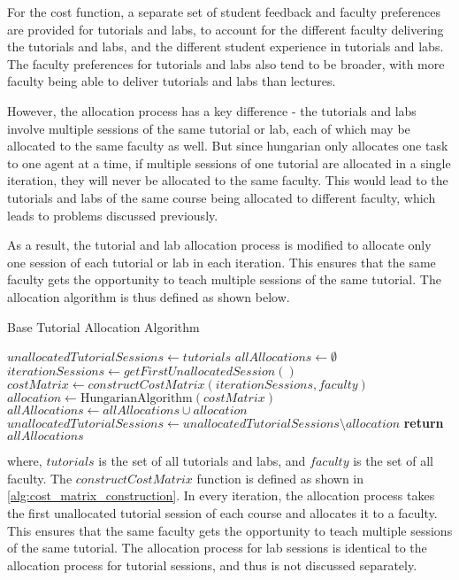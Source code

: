 For the cost function, a separate set of student feedback and faculty preferences are provided for tutorials and labs, to account for the different faculty delivering the tutorials and labs, and the different student experience in tutorials and labs. The faculty preferences for tutorials and labs also tend to be broader, with more faculty being able to deliver tutorials and labs than lectures.

However, the allocation process has a key difference - the tutorials and labs involve multiple sessions of the same tutorial or lab, each of which may be allocated to the same faculty as well. But since hungarian only allocates one task to one agent at a time, if multiple sessions of one tutorial are allocated in a single iteration, they will never be allocated to the same faculty. This would lead to the tutorials and labs of the same course being allocated to different faculty, which leads to problems discussed previously.

As a result, the tutorial and lab allocation process is modified to allocate only one session of each tutorial or lab in each iteration. This ensures that the same faculty gets the opportunity to teach multiple sessions of the same tutorial. The allocation algorithm is thus defined as shown below.

\begin{algorithm}[H]
  \caption*{Base Tutorial Allocation Algorithm}
  \begin{algorithmic}
    \State $unallocatedTutorialSessions \gets tutorials$
    \State $allAllocations \gets \emptyset$
    \State $iterationSessions \gets getFirstUnallocatedSession()$
    \State $costMatrix \gets constructCostMatrix(iterationSessions, faculty)$
    \State $allocation \gets \text{HungarianAlgorithm}(costMatrix)$
    \State $allAllocations \gets allAllocations \cup allocation$
    \State $unallocatedTutorialSessions \gets unallocatedTutorialSessions \setminus allocation$
    \EndWhile
    \State \textbf{return} $allAllocations$
    \EndProcedure
  \end{algorithmic}
\end{algorithm}

where, $tutorials$ is the set of all tutorials and labs, and $faculty$ is the set of all faculty. The $constructCostMatrix$ function is defined as shown in \autoref{alg:cost_matrix_construction}. In every iteration, the allocation process takes the first unallocated tutorial session of each course and allocates it to a faculty. This ensures that the same faculty gets the opportunity to teach multiple sessions of the same tutorial. The allocation process for lab sessions is identical to the allocation process for tutorial sessions, and thus is not discussed separately.

